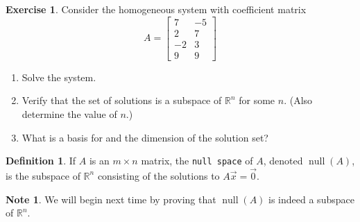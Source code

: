 \documentclass{beamer}
\newcommand{\R}{\mathbb{R}}
\newcommand{\fn}{\insertframenumber}
\theoremstyle{definition}
\newtheorem{exercise}{Exercise}
\newtheorem*{defn}{Definition}
\newtheorem*{nb}{Note}
\renewcommand{\emph}[1]{{\color{blue}\texttt{#1}}}
\begin{document}
\begin{frame}{\fn}
	\begin{exercise}
		Consider the homogeneous system with coefficient matrix
		\[A=\begin{bmatrix}
		7 & -5 \\
		2 & 7 \\
		-2 & 3 \\
		9 & 9
		\end{bmatrix}\]
		\begin{enumerate}[label=(\alph*)]
			\item Solve the system.
			
			\item Verify that the set of solutions is a subspace of $\R^n$ for some $n$.  (Also determine the value of $n$.)
			
			\item What is a basis for and the dimension of the solution set?
		\end{enumerate} 
	\end{exercise}
\end{frame}

\begin{frame}{\fn}
	\begin{defn}
		If $A$ is an $m\times n$ matrix, the \emph{null space} of $A$, denoted $\operatorname{null}(A)$, is the subspace of $\R^n$ consisting of the solutions to $A\vec x=\vec 0$.
	\end{defn}
	\begin{nb}
		We will begin next time by proving that $\operatorname{null}(A)$ is indeed a subspace of $\R^n$.
	\end{nb}
\end{frame}
\end{document}
